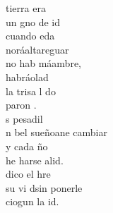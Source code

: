 \begin{cancion}%
	 tierra era\\
	 un gno de id\\
	cuando eda\\
	noráaltareguar\\
	no hab máambre,\\
	habráolad\\
	la trisa l do\\
	paron .\\
	\jump
	s pesadil\\
	n bel sueñoane cambiar\\
	y cada ño\\
	he harse alid.\\
	 dico el hre \\
	 su vi dsin ponerle\\
	ciogun la id.\\
\end{cancion}%
